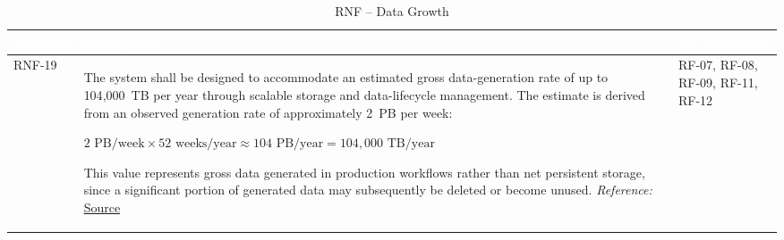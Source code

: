 \documentclass{article}
\begin{document}
\begin{table}[H]

\centering

\small

\renewcommand{\arraystretch}{1.35}

\caption{RNF -- Data Growth}

\label{tab:rnf_data_growth}

\begin{tabularx}{\textwidth}{|p{2.2cm}|X|p{3.5cm}|}

\hline

\rowcolor[HTML]{1F2937}

\textcolor{white}{\textbf{Identifier}} &
\textcolor{white}{\textbf{Description}} &
\textcolor{white}{\textbf{RF associated}} \\ \hline

RNF-19 &
The system shall be designed to accommodate an estimated gross data-generation rate of up to 104{,}000~TB per year through scalable storage and data-lifecycle management. The estimate is derived from an observed generation rate of approximately 2~PB per week:

\(\displaystyle
2\text{ PB/week}\times52\text{ weeks/year}
\approx104\text{ PB/year}
=104{,}000\text{ TB/year}
\)

This value represents gross data generated in production workflows rather than net persistent storage, since a significant portion of generated data may subsequently be deleted or become unused.
\textit{Reference:} \href{https://netflixtechblog.medium.com/navigating-the-netflix-data-deluge-the-imperative-of-effective-data-management-e39af70f81f7}{Source}
&
RF-07, RF-08, RF-09, RF-11, RF-12 \\ \hline

\end{tabularx}

\end{table}


\end{document}
